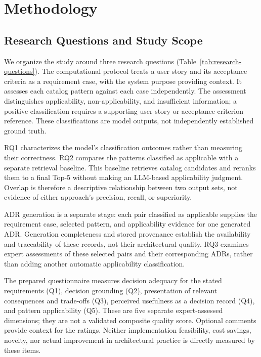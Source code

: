 \section{Methodology}
\label{sec:methodology}

\subsection{Research Questions and Study Scope}
\label{sec:research-questions}

We organize the study around three research questions
(Table~\ref{tab:research-questions}). The computational protocol treats a user
story and its acceptance criteria as a requirement case, with the system purpose
providing context. It assesses each catalog pattern against each case
independently. The assessment distinguishes applicability, non-applicability,
and insufficient information; a positive classification requires a supporting
user-story or acceptance-criterion reference. These classifications are model
outputs, not independently established ground truth.



RQ1 characterizes the model's classification outcomes rather than measuring
their correctness. RQ2 compares the patterns classified as applicable with a
separate retrieval baseline. This baseline retrieves catalog candidates and
reranks them to a final Top-5 without making an LLM-based applicability judgment.
Overlap is therefore a descriptive relationship between two output sets, not
evidence of either approach's precision, recall, or superiority.

ADR generation is a separate stage: each pair classified as applicable supplies
the requirement case, selected pattern, and applicability evidence for one
generated ADR. Generation completeness and stored provenance establish the
availability and traceability of these records, not their architectural quality.
RQ3 examines expert assessments of these selected pairs and their corresponding
ADRs, rather than adding another automatic applicability classification.

The prepared questionnaire measures decision adequacy for the stated
requirements (Q1), decision grounding (Q2), presentation of relevant
consequences and trade-offs (Q3), perceived usefulness as a decision record
(Q4), and pattern applicability (Q5). These are five separate expert-assessed
dimensions; they are not a validated composite quality score. Optional comments
provide context for the ratings. Neither implementation feasibility, cost
savings, novelty, nor actual improvement in architectural practice is directly
measured by these items.

